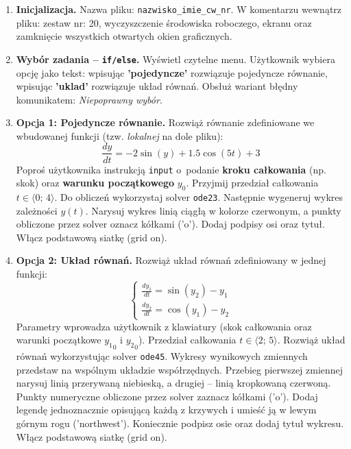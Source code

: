 \documentclass[a4paper,11pt]{article}
\begin{document}
\begin{enumerate}[leftmargin=*, label=\textbf{\arabic*.}, itemsep=2pt]

  \item \textbf{Inicjalizacja.}
    Nazwa pliku: \texttt{nazwisko\_imie\_cw\_nr}. W komentarzu wewnątrz pliku: zestaw nr: 20, wyczyszczenie środowiska roboczego, ekranu oraz zamknięcie wszystkich otwartych okien graficznych.

  \item \textbf{Wybór zadania -- \texttt{if/else}.}
    Wyświetl czytelne menu. Użytkownik wybiera opcję jako tekst: wpisując \textbf{'pojedyncze'} rozwiązuje pojedyncze równanie, wpisując \textbf{'uklad'} rozwiązuje układ równań. Obsłuż wariant błędny komunikatem: \textit{Niepoprawny wybór}.

  \item \textbf{Opcja 1: Pojedyncze równanie.}
    Rozwiąż równanie zdefiniowane we wbudowanej funkcji (tzw. \textit{lokalnej} na dole pliku):
    \[ \frac{dy}{dt} = -2\sin(y) + 1.5\cos(5t) + 3 \]
    Poproś użytkownika instrukcją \texttt{input} o~podanie \textbf{kroku całkowania} (np. skok) oraz \textbf{warunku początkowego} $y_0$. Przyjmij przedział całkowania $t \in \langle 0;\,4 \rangle$.
    Do obliczeń wykorzystaj solver \texttt{ode23}. Następnie wygeneruj wykres zależności $y(t)$. Narysuj wykres linią ciągłą w kolorze czerwonym, a punkty obliczone przez solver oznacz kółkami ('o'). Dodaj podpisy osi oraz tytuł. Włącz podstawową siatkę (grid on).

  \item \textbf{Opcja 2: Układ równań.}
    Rozwiąż układ równań zdefiniowany w jednej funkcji:\\[-0.5em]
    \[
    \begin{cases}
      \frac{dy_1}{dt} = \sin(y_2) - y_1 \\
      \frac{dy_2}{dt} = \cos(y_1) - y_2
    \end{cases}
    \]
    Parametry wprowadza użytkownik z klawiatury (skok całkowania oraz warunki początkowe $ {y_1}_{0} $ i $ {y_2}_{0} $). Przedział całkowania $t \in \langle 2;\,5 \rangle$.
    Rozwiąż układ równań wykorzystując solver \texttt{ode45}. Wykresy wynikowych zmiennych przedstaw na wspólnym układzie współrzędnych. Przebieg pierwszej zmiennej narysuj linią przerywaną niebieską, a drugiej -- linią kropkowaną czerwoną. Punkty numeryczne obliczone przez solver zaznacz kółkami ('o'). Dodaj legendę jednoznacznie opisującą każdą z krzywych i umieść ją w lewym górnym rogu ('northwest'). Koniecznie podpisz osie oraz dodaj tytuł wykresu. Włącz podstawową siatkę (grid on).

\end{enumerate}
\end{document}
